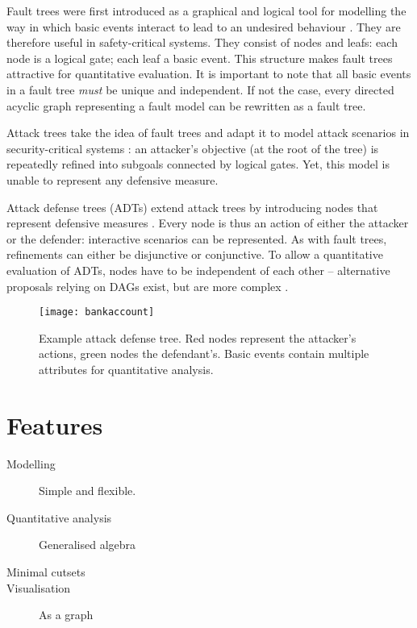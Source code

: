 \documentclass{scrreprt}
\begin{document}
Fault trees were first introduced as a graphical and logical tool for modelling
the way in which basic events interact to lead to an undesired behaviour
\cite[IV.1]{Vesely1981}. They are therefore useful in safety-critical systems.
They consist of nodes and leafs: each node is a logical gate; each leaf a basic
event. This structure makes fault trees attractive for quantitative evaluation.
It is important to note that all basic events in a fault tree \textit{must} be
unique and independent. If not the case, every directed acyclic graph
representing a fault model can be rewritten as a fault tree.  

Attack trees take the idea of fault trees and adapt it to model attack scenarios
in security-critical systems \cite{Schneier1999} \cite{Brooke2003}
\cite{NaiFovino2009}: an attacker's objective (at the root of the tree) is
repeatedly refined into subgoals connected by logical gates. Yet, this model is
unable to represent any defensive measure.

Attack defense trees (ADTs) extend attack trees by introducing nodes that
represent defensive measures \cite{Kordy}. Every node is thus an action of
either the attacker or the defender: interactive scenarios can be represented.
As with fault trees, refinements can either be disjunctive or conjunctive. To
allow a quantitative evaluation of ADTs, nodes have to be independent of each
other -- alternative proposals relying on DAGs exist, but are more complex
\cite{Kordy2013a}.

\begin{figure}[h]
    \label{example-adt}
    \centering
    \texttt{[image: bankaccount]}
    \caption{Example attack defense tree. Red nodes represent the attacker's
    actions, green nodes the defendant's. Basic events contain multiple
    attributes for quantitative analysis.}
\end{figure}



\section{Features}


\begin{description}
    \item [Modelling] Simple and flexible.
    \item [Quantitative analysis] Generalised algebra \cite{Kordy2012}
    \item [Minimal cutsets]
    \item [Visualisation] As a graph
\end{description}
\end{document}

